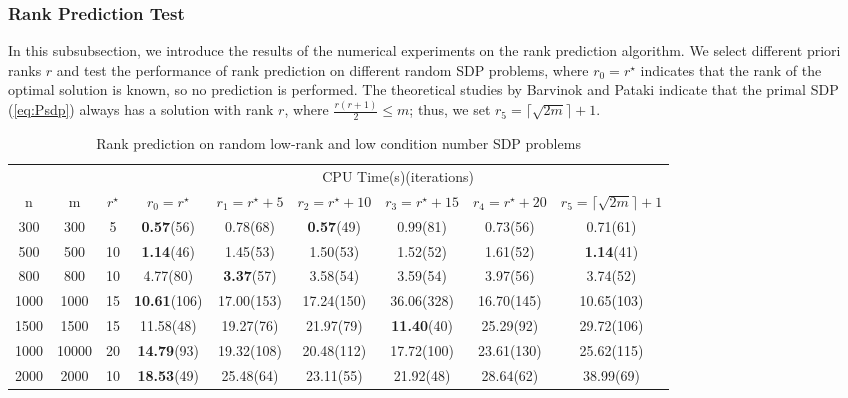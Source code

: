 \documentclass{jcmlatex}
\begin{document}
\subsubsection{Rank Prediction Test}\label{subsubsec5.1.2}
In this subsubsection, we introduce the results of the numerical experiments on the rank prediction algorithm. We select different priori ranks \( r \) and test the performance of rank prediction on different random SDP problems, where \( r_{0}=r^{\star} \) indicates that the rank of the optimal solution is known, so no prediction is performed. The theoretical studies by Barvinok\cite{barvinok1995problems} and Pataki \cite{burer2003nonlinear} indicate that the primal SDP (\ref{eq:Psdp}) always has a solution with rank \( r \), where \( \frac{r(r + 1)}{2} \leq m \); thus, we set \( r_{5}=\lceil \sqrt{2m} \rceil + 1 \).
\begin{table}
    \centering
    \caption{Rank prediction on random low-rank and low condition number SDP problems}\label{t2}
    \setlength\tabcolsep{0.9pt}
    \begin{tabular*}{\textwidth}{@{\extracolsep\fill}ccccccccc}
\toprule 
~&~&~& \multicolumn{6}{c}{CPU Time(s)(iterations)}  \\ 
\cmidrule{4-9}
n&m&\(r^{\star}\)&\(r_0=r^{\star}\)&\(r_1=r^{\star}+5\)&\(r_2=r^{\star}+10\)&\(r_3=r^{\star}+15\)&\(r_4=r^{\star}+20\)&\( r_5 = \lceil \sqrt{2m} \rceil + 1 \)\\
\midrule    
300&300&5&\textbf{0.57}(56) &0.78(68) &\textbf{0.57}(49)&0.99(81)&0.73(56)&0.71(61) \\
500&500&10&\textbf{1.14}(46) &1.45(53) &1.50(53) &1.52(52) &1.61(52)&\textbf{1.14}(41) \\
800&800&10&4.77(80) &\textbf{3.37}(57) &3.58(54) &3.59(54) &3.97(56)&3.74(52) \\
1000&1000&15&\textbf{10.61}(106) &17.00(153) &17.24(150) &36.06(328) &16.70(145)&10.65(103) \\
1500&1500&15&11.58(48) &19.27(76) &21.97(79) &\textbf{11.40}(40) &25.29(92)&29.72(106) \\
1000&10000&20&\textbf{14.79}(93) &19.32(108) &20.48(112) &17.72(100) &23.61(130)&25.62(115) \\
2000&2000&10&\textbf{18.53}(49) &25.48(64) &23.11(55) &21.92(48) &28.64(62)&38.99(69) \\
\hline
\end{tabular*}
\end{table}
\end{document}
